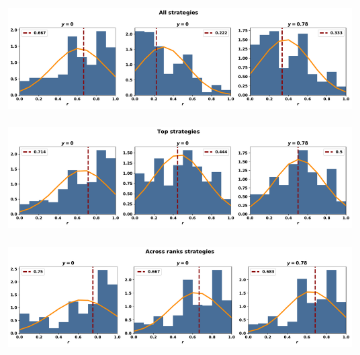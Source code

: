 \begin{table}[!htbp]
    \begin{center}
    \resizebox{.9\textwidth}{!}{
        
    }
\end{center}
\end{table}

\begin{figure}[!htbp]
    \begin{subfigure}{\textwidth}
    \includegraphics[width=\textwidth]{src/chapters/07/img/normalised_rank_all_strategies.pdf}
    \end{subfigure}
    \par\bigskip
    \begin{subfigure}{\textwidth}
    \includegraphics[width=\textwidth]{src/chapters/07/img/normalised_rank_top_strategies.pdf}
    \end{subfigure}
    \par\bigskip
    \begin{subfigure}{\textwidth}
    \includegraphics[width=\textwidth]{src/chapters/07/img/normalised_rank_across_ranks_strategies.pdf}
    \end{subfigure}

\end{figure}
